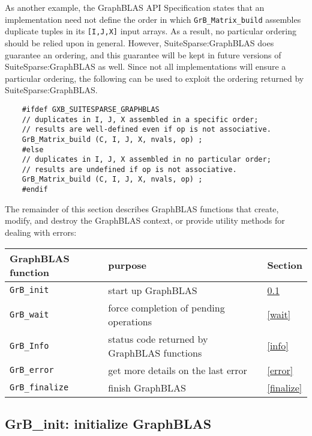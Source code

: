 \documentclass[12pt]{article}
\begin{document}
As another example, the GraphBLAS API Specification states that an
implementation need not define the order in which \verb'GrB_Matrix_build'
assembles duplicate tuples in its \verb'[I,J,X]' input arrays.  As a result, no
particular ordering should be relied upon in general.  However,
SuiteSparse:GraphBLAS does guarantee an ordering, and this guarantee will be
kept in future versions of SuiteSparse:GraphBLAS as well.  Since not all
implementations will ensure a particular ordering, the following can be used to
exploit the ordering returned by SuiteSparse:GraphBLAS.

    {\footnotesize
    \begin{verbatim}
    #ifdef GXB_SUITESPARSE_GRAPHBLAS
    // duplicates in I, J, X assembled in a specific order;
    // results are well-defined even if op is not associative.
    GrB_Matrix_build (C, I, J, X, nvals, op) ;
    #else
    // duplicates in I, J, X assembled in no particular order;
    // results are undefined if op is not associative.
    GrB_Matrix_build (C, I, J, X, nvals, op) ;
    #endif \end{verbatim}}

The remainder of this section describes GraphBLAS functions that create,
modify, and destroy the GraphBLAS context, or provide utility methods for
dealing with errors:

\vspace{0.2in}
{\footnotesize
\begin{tabular}{lll}
\hline
GraphBLAS function   & purpose                                      & Section \\
\hline
\verb'GrB_init'      & start up GraphBLAS                           & \ref{init} \\
\verb'GrB_wait'      & force completion of pending operations       & \ref{wait}\\
\verb'GrB_Info'      & status code returned by GraphBLAS functions  & \ref{info} \\
\verb'GrB_error'     & get more details on the last error           & \ref{error} \\
\verb'GrB_finalize'  & finish GraphBLAS                             & \ref{finalize} \\
\hline
\end{tabular}
}
\vspace{0.2in}

\newpage
\subsection{{\sf GrB\_init:} initialize GraphBLAS} %
\label{init}
\end{document}
